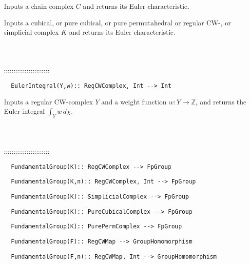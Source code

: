 \documentclass[a4paper,11pt]{report}
\begin{document}
{ 

 Inputs a chain complex $C$ and returns its Euler characteristic. 

 Inputs a cubical, or pure cubical, or pure permutahedral or regular CW-, or
simplicial complex $K$ and returns its Euler characteristic. \\
 \\
 \\
 \\
 ::::::::::::::::::::::::\\
 
\begin{verbatim}  EulerIntegral(Y,w):: RegCWComplex, Int --> Int
\end{verbatim}


 

 Inputs a regular CW-complex $Y$ and a weight function $w\colon Y\rightarrow \mathbb Z$, and returns the Euler integral $ \int_Y w\, d\chi $. \\
 \\
 \\
 \\
 ::::::::::::::::::::::::\\
 
\begin{verbatim}  FundamentalGroup(K):: RegCWComplex --> FpGroup
\end{verbatim}
 
\begin{verbatim}  FundamentalGroup(K,n):: RegCWComplex, Int --> FpGroup
\end{verbatim}
 
\begin{verbatim}  FundamentalGroup(K):: SimplicialComplex --> FpGroup
\end{verbatim}
 
\begin{verbatim}  FundamentalGroup(K):: PureCubicalComplex --> FpGroup
\end{verbatim}
 
\begin{verbatim}  FundamentalGroup(K):: PurePermComplex --> FpGroup
\end{verbatim}


 
\begin{verbatim}  FundamentalGroup(F):: RegCWMap --> GroupHomomorphism
\end{verbatim}
 
\begin{verbatim}  FundamentalGroup(F,n):: RegCWMap, Int --> GroupHomomorphism
\end{verbatim}


}
\end{document}
